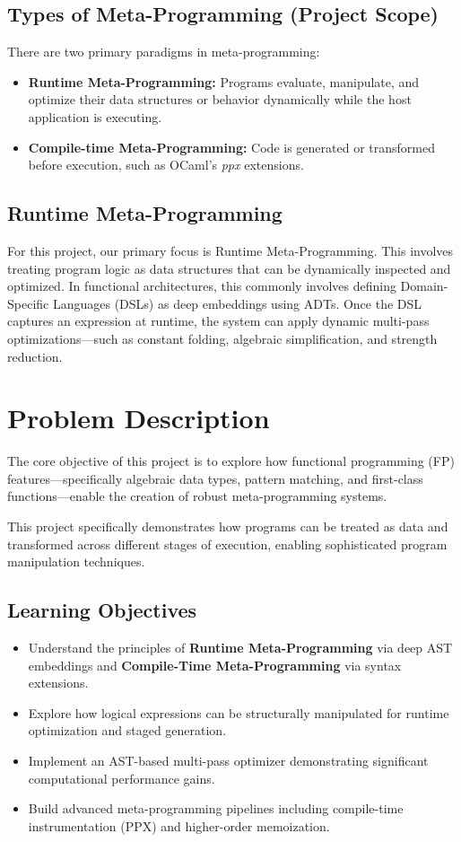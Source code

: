\documentclass[12pt]{article}
\begin{document}
\subsection{Types of Meta-Programming (Project Scope)}

There are two primary paradigms in meta-programming:
\begin{itemize}
    \item \textbf{Runtime Meta-Programming:} Programs evaluate, manipulate, and optimize their data structures or behavior dynamically while the host application is executing.
    \item \textbf{Compile-time Meta-Programming:} Code is generated or transformed before execution, such as OCaml's \textit{ppx} extensions. 
\end{itemize}

\subsection{Runtime Meta-Programming }
For this project, our primary focus is Runtime Meta-Programming. This involves treating program logic as data structures that can be dynamically inspected and optimized. In functional architectures, this commonly involves defining Domain-Specific Languages (DSLs) as deep embeddings using ADTs. Once the DSL captures an expression at runtime, the system can apply dynamic multi-pass optimizations---such as constant folding, algebraic simplification, and strength reduction. 



\section{Problem Description}

The core objective of this project is to explore how functional programming (FP) features---specifically algebraic data types, pattern matching, and first-class functions---enable the creation of robust meta-programming systems.

This project specifically demonstrates how programs can be treated as data and transformed across different stages of execution, enabling sophisticated program manipulation techniques.

\subsection*{Learning Objectives}
\begin{itemize}
    \item Understand the principles of \textbf{Runtime Meta-Programming} via deep AST embeddings and \textbf{Compile-Time Meta-Programming} via syntax extensions.
    \item Explore how logical expressions can be structurally manipulated for runtime optimization and staged generation.
    \item Implement an AST-based multi-pass optimizer demonstrating significant computational performance gains.
    \item Build advanced meta-programming pipelines including compile-time instrumentation (PPX) and higher-order memoization.
\end{itemize}
\end{document}

